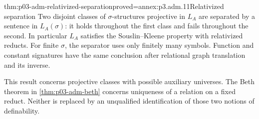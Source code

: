 \begin{hbtheorem}{thm:p03-adm-relativized-separation}{proved=annex:p3.adm.11}{Relativized separation}
Two disjoint classes of \(\sigma\)-structures projective in \(L_A\)
are separated by a sentence in \(L_A(\sigma)\): it holds throughout the
first class and fails throughout the second. In particular \(L_A\)
satisfies the Souslin--Kleene property with relativized reducts.
For finite \(\sigma\), the separator uses only finitely many symbols.
Function and constant signatures have the same conclusion after
relational graph translation and its inverse.
\end{hbtheorem}

This result concerns projective classes with possible auxiliary universes.
The Beth theorem in \cref{thm:p03-adm-beth} concerns uniqueness of a
relation on a fixed reduct. Neither is replaced by an unqualified
identification of those two notions of definability.
